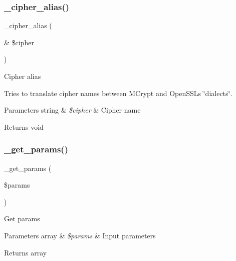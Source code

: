 \subsubsection{\texorpdfstring{\+\_\+cipher\+\_\+alias()}{\_cipher\_alias()}}
{\footnotesize\ttfamily \+\_\+cipher\+\_\+alias (\begin{DoxyParamCaption}\item[{\&}]{\$cipher }\end{DoxyParamCaption})\hspace{0.3cm}{\ttfamily [protected]}}

Cipher alias

Tries to translate cipher names between M\+Crypt and Open\+S\+SL\textquotesingle{}s \char`\"{}dialects\char`\"{}.


\begin{DoxyParams}[1]{Parameters}
string & {\em \$cipher} & Cipher name \\
\hline
\end{DoxyParams}
\begin{DoxyReturn}{Returns}
void 
\end{DoxyReturn}
\mbox{\label{class_c_i___encryption_ab5bb04b4151b23afd9dccad358b3967b}} 
\subsubsection{\texorpdfstring{\+\_\+get\+\_\+params()}{\_get\_params()}}
{\footnotesize\ttfamily \+\_\+get\+\_\+params (\begin{DoxyParamCaption}\item[{}]{\$params }\end{DoxyParamCaption})\hspace{0.3cm}{\ttfamily [protected]}}

Get params


\begin{DoxyParams}[1]{Parameters}
array & {\em \$params} & Input parameters \\
\hline
\end{DoxyParams}
\begin{DoxyReturn}{Returns}
array 
\end{DoxyReturn}
\mbox{\label{class_c_i___encryption_a7d3a3c3cc3609b5af60bfa953892a058}} 
